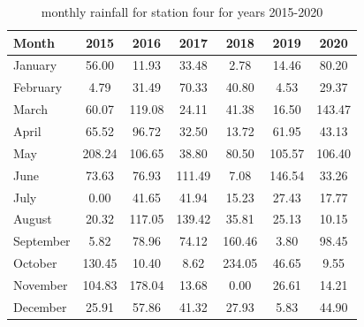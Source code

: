 \documentclass[12pt]{article}
\theoremstyle{definition}
\begin{document}
\begin{table}[ht]
  \centering
  \caption{monthly rainfall for station  four for years 2015-2020}
  \label{tab:station4}
  \begin{tabular}{l *{6}{S[table-format=3.2]}}
    \toprule
    \textbf{Month} & \textbf{2015} & \textbf{2016} & \textbf{2017} & \textbf{2018} & \textbf{2019} & \textbf{2020} \\
    \midrule
    January  & 56.00 & 11.93 & 33.48 &  2.78 & 14.46 & 80.20 \\
    February &  4.79 & 31.49 & 70.33 & 40.80 &  4.53 & 29.37 \\
    March    & 60.07 &119.08 & 24.11 & 41.38 & 16.50 &143.47 \\
    April    & 65.52 & 96.72 & 32.50 & 13.72 & 61.95 & 43.13 \\
    May      &208.24 &106.65 & 38.80 & 80.50 &105.57 &106.40 \\
    June     & 73.63 & 76.93 &111.49 &  7.08 &146.54 & 33.26 \\
    July     &  0.00 & 41.65 & 41.94 & 15.23 & 27.43 & 17.77 \\
    August   & 20.32 &117.05 &139.42 & 35.81 & 25.13 & 10.15 \\
    September&  5.82 & 78.96 & 74.12 &160.46 &  3.80 & 98.45 \\
    October  &130.45 & 10.40 &  8.62 &234.05 & 46.65 &  9.55 \\
    November &104.83 &178.04 & 13.68 &  0.00 & 26.61 & 14.21 \\
    December & 25.91 & 57.86 & 41.32 & 27.93 &  5.83 & 44.90 \\
    \bottomrule
  \end{tabular}
\end{table}
\\
\end{document}
